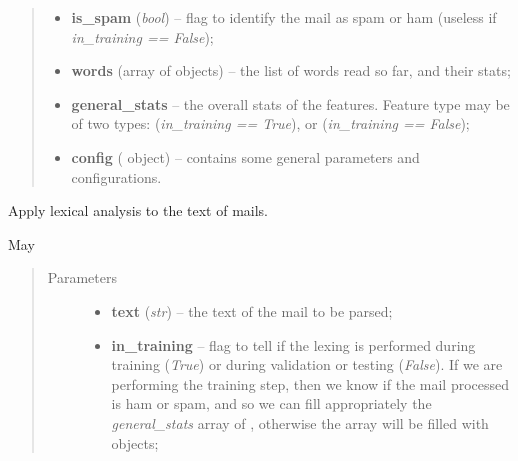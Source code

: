 \documentclass[letterpaper,10pt,english]{sphinxmanual}
\begin{document}
\begin{fulllineitems}
\begin{fulllineitems}
\begin{quote}
\begin{description}
\begin{itemize}
\item {} 
\textbf{is\_spam} (\emph{bool}) -- flag to identify the mail as spam or ham (useless if             \emph{in\_training == False});

\item {} 
\textbf{words} (array of {\hyperref[index:gen_stat.Word]{}} objects) -- the list of words read so far, and their stats;

\item {} 
\textbf{general\_stats} -- the overall stats of the features. Feature type may be            of two types:                {\hyperref[index:gen_stat.Stat]{}} (\emph{in\_training == True}), or                {\hyperref[index:test_stat.Test_stat]{}} (\emph{in\_training == False});

\item {} 
\textbf{config} ({\hyperref[index:config.Config]{}} object) -- contains some general parameters and configurations.

\end{itemize}

\end{description}\end{quote}

\end{fulllineitems}


\begin{fulllineitems}
\label{index:lexer.Lexer.lexer_words}
Apply lexical analysis to the text of mails.

May
\begin{quote}\begin{description}
\item[{Parameters}] \leavevmode\begin{itemize}
\item {} 
\textbf{text} (\emph{str}) -- the text of the mail to be parsed;

\item {} 
\textbf{in\_training} -- flag to tell if the lexing is performed during training            (\emph{True}) or during validation or testing (\emph{False}). If we are performing            the training step, then we know if the mail processed is ham or spam, and
so we can fill appropriately the \emph{general\_stats} array of
{\hyperref[index:gen_stat.Stat]{}}, otherwise the array will be filled with
{\hyperref[index:test_stat.Test_stat]{}} objects;


\end{itemize}
\end{description}
\end{quote}
\end{fulllineitems}
\end{fulllineitems}
\end{document}
